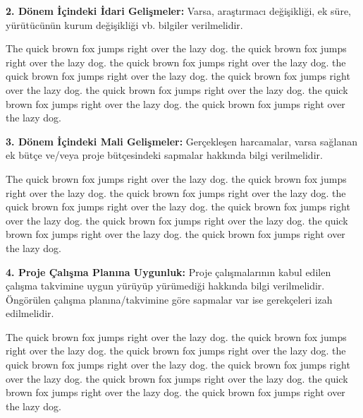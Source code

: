 \documentclass[10pt]{article}
\begin{document}
\noindent\textbf{2. Dönem İçindeki İdari Gelişmeler:} Varsa, araştırmacı değişikliği, ek süre, yürütücünün kurum değişikliği vb. bilgiler verilmelidir.

\bigskip

\begin{framed}
        The quick brown fox jumps right over the lazy dog. the quick brown fox jumps right over the lazy dog. the quick brown fox jumps right over the lazy dog. the quick brown fox jumps right over the lazy dog. the quick brown fox jumps right over the lazy dog. the quick brown fox jumps right over the lazy dog. the quick brown fox jumps right over the lazy dog. the quick brown fox jumps right over the lazy dog.
\end{framed}

\bigskip

\bigskip

\noindent\textbf{3. Dönem İçindeki Mali Gelişmeler:} Gerçekleşen harcamalar, varsa sağlanan ek bütçe ve/veya proje bütçesindeki sapmalar hakkında bilgi verilmelidir.

\bigskip

\begin{framed}
        The quick brown fox jumps right over the lazy dog. the quick brown fox jumps right over the lazy dog. the quick brown fox jumps right over the lazy dog. the quick brown fox jumps right over the lazy dog. the quick brown fox jumps right over the lazy dog. the quick brown fox jumps right over the lazy dog. the quick brown fox jumps right over the lazy dog. the quick brown fox jumps right over the lazy dog.
\end{framed}

\bigskip

\bigskip

\noindent\textbf{4. Proje Çalışma Planına Uygunluk:} Proje çalışmalarının kabul edilen çalışma takvimine uygun yürüyüp yürümediği hakkında bilgi verilmelidir. Öngörülen çalışma planına/takvimine göre sapmalar var ise gerekçeleri izah edilmelidir.

\bigskip

\begin{framed}
        The quick brown fox jumps right over the lazy dog. the quick brown fox jumps right over the lazy dog. the quick brown fox jumps right over the lazy dog. the quick brown fox jumps right over the lazy dog. the quick brown fox jumps right over the lazy dog. the quick brown fox jumps right over the lazy dog. the quick brown fox jumps right over the lazy dog. the quick brown fox jumps right over the lazy dog.
\end{framed}
\end{document}
